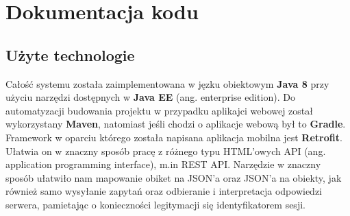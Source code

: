 \chapter{Dokumentacja kodu}

\section{Użyte technologie}
Całość systemu została zaimplementowana w jęzku obiektowym \textbf{Java 8} przy użyciu narzędzi dostępnych w \textbf{Java EE} (ang. enterprise edition). Do automatyzacji budowania projektu w przypadku aplikajci webowej został wykorzystany \textbf{Maven}, natomiast jeśli chodzi o aplikacje webową był to \textbf{Gradle}. Framework w oparciu którego została napisana aplikacja mobilna jest \textbf{Retrofit}. Ułatwia on w znaczny sposób pracę z różnego typu HTML'owych API (ang. application programming interface), m.in REST API. Narzędzie w znaczny sposób ułatwiło nam mapowanie obiket na JSON'a oraz JSON'a na obiekty, jak również samo wysyłanie zapytań oraz odbieranie i interpretacja odpowiedzi serwera, pamietając o konieczności legitymacji się identyfikatorem sesji.

